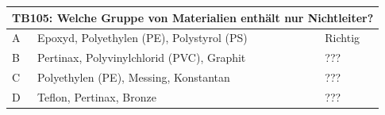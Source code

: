 \begin{frame}
	\begin{small}	
	\begin{tabular}{|l|l|l|}
	\hline
		\multicolumn{3}{|c|}{\textbf{TB105:} Welche Gruppe von Materialien enthält nur Nichtleiter?}\\
		\hline
		A & Epoxyd, Polyethylen (PE), Polystyrol (PS) & Richtig \\ \hline
		B & Pertinax, Polyvinylchlorid (PVC), Graphit & ??? \\ \hline
		C & Polyethylen (PE), Messing, Konstantan & ??? \\ \hline
		D & Teflon, Pertinax, Bronze & ??? \\ \hline 		
	\end{tabular}
	\end{small}
\end{frame}

